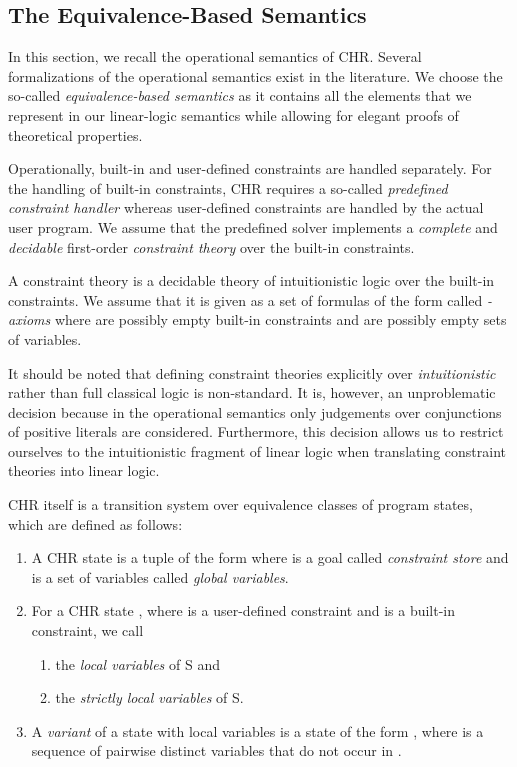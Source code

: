 \documentclass[acmtocl]{acmtrans2m}
\begin{document}
\subsection{The Equivalence-Based Semantics }
\label{sec:op-sem}

In this section, we recall the operational semantics of CHR. Several
formalizations of the operational semantics  exist in the literature. We
choose the so-called \emph{equivalence-based semantics}  as it contains
all the elements that we represent in our linear-logic semantics while allowing
for elegant proofs of theoretical properties.

Operationally, built-in and user-defined constraints are handled separately. For
the handling of built-in constraints, CHR requires a so-called
\emph{predefined constraint handler} whereas user-defined constraints are
handled by the actual user program. We assume that the predefined solver
implements a \emph{complete} and \emph{decidable} first-order \emph{constraint theory}
 over the built-in constraints.

\begin{definition} A constraint theory  is a decidable
theory of intuitionistic logic over the built-in constraints. We assume that it
is given as a set of formulas  of the form  called
\emph{-axioms} where  are possibly empty built-in constraints and
 are possibly empty sets of variables.
\end{definition}

It should be noted that defining constraint theories explicitly over
\emph{intuitionistic} rather than full classical logic is non-standard. It is,
however, an unproblematic decision because in the operational semantics only
judgements over conjunctions of positive literals are considered. Furthermore,
this decision allows us to restrict ourselves to the intuitionistic fragment of
linear logic when translating constraint theories into linear logic.

CHR itself is a transition system over equivalence classes of program states,
which are defined as follows:

\begin{definition}
\label{def:binary-state}
\begin{enumerate}
\item  A CHR state is a tuple of the form  where  is a
goal called \emph{constraint store} and  is a set of variables called
\emph{global variables}.
\item For a CHR state , where  is a
user-defined constraint and  is a built-in constraint, we
call
\begin{enumerate}
\item \quad the
\emph{local variables} of S and
\item \quad the \emph{strictly local
variables} of S.
\end{enumerate}
\item A \emph{variant} of a state  with local variables
 is a state  of the form , where  is a sequence
of pairwise distinct variables that do not occur in .
\end{enumerate}
\end{definition}
\end{document}
